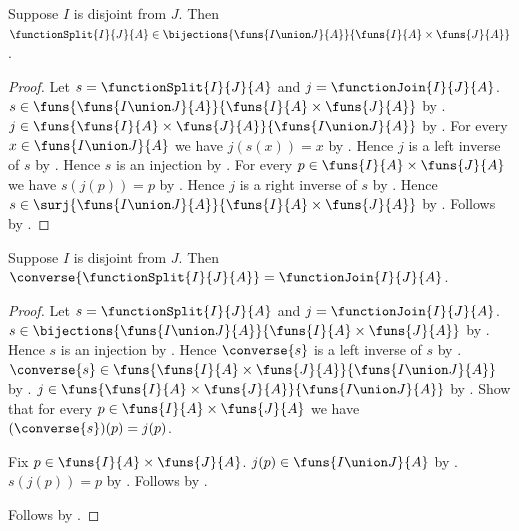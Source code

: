\begin{theorem}\label{function_split_bijection}
    Suppose $I$ is disjoint from $J$.
    Then $\functionSplit{I}{J}{A}\in
        \bijections{\funs{I\union J}{A}}{\funs{I}{A}\times\funs{J}{A}}$.
\end{theorem}
\begin{proof}
    Let $s=\functionSplit{I}{J}{A}$ and $j=\functionJoin{I}{J}{A}$.
    $s\in\funs{\funs{I\union J}{A}}{\funs{I}{A}\times\funs{J}{A}}$ by
        .
    $j\in\funs{\funs{I}{A}\times\funs{J}{A}}{\funs{I\union J}{A}}$ by
        .
    For every $x\in\funs{I\union J}{A}$ we have $j(s(x))=x$ by
        .
    Hence $j$ is a left inverse of $s$ by .
    Hence $s$ is an injection by .
    For every $p\in\funs{I}{A}\times\funs{J}{A}$ we have $s(j(p))=p$ by
        .
    Hence $j$ is a right inverse of $s$ by .
    Hence $s\in\surj{\funs{I\union J}{A}}{\funs{I}{A}\times\funs{J}{A}}$ by
        .
    Follows by .
\end{proof}

\begin{theorem}\label{function_split_converse}
    Suppose $I$ is disjoint from $J$.
    Then $\converse{\functionSplit{I}{J}{A}}=\functionJoin{I}{J}{A}$.
\end{theorem}
\begin{proof}
    Let $s=\functionSplit{I}{J}{A}$ and $j=\functionJoin{I}{J}{A}$.
    $s\in\bijections{\funs{I\union J}{A}}{\funs{I}{A}\times\funs{J}{A}}$ by
        .
    Hence $s$ is an injection by .
    Hence $\converse{s}$ is a left inverse of $s$ by
        .
    $\converse{s}\in\funs{\funs{I}{A}\times\funs{J}{A}}{\funs{I\union J}{A}}$ by
        .
    $j\in\funs{\funs{I}{A}\times\funs{J}{A}}{\funs{I\union J}{A}}$ by
        .
    Show that for every $p\in\funs{I}{A}\times\funs{J}{A}$ we have
        $(\converse{s})(p)=j(p)$.
    \begin{subproof}
        Fix $p\in\funs{I}{A}\times\funs{J}{A}$.
        $j(p)\in\funs{I\union J}{A}$ by .
        $s(j(p))=p$ by .
        Follows by .
    \end{subproof}
    Follows by .
\end{proof}

